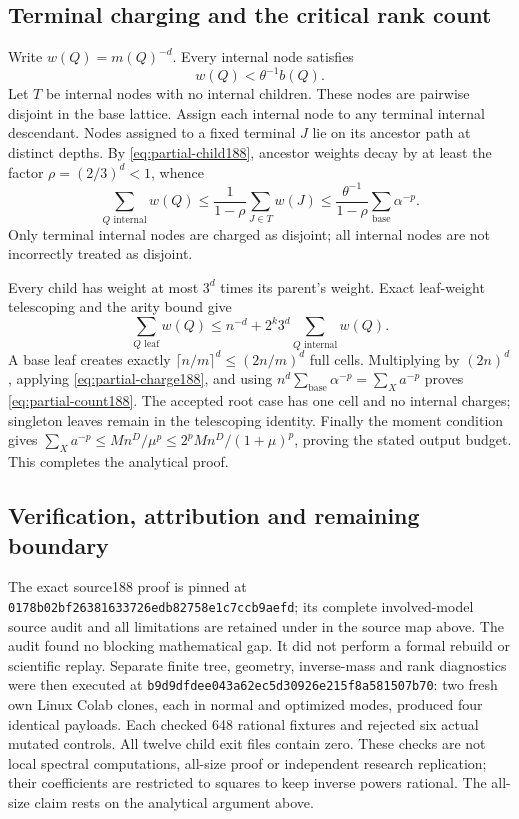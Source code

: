 \subsection{Terminal charging and the critical rank count}
Write $w(Q)=m(Q)^{-d}$. Every internal node satisfies
\[
 w(Q)<\theta^{-1}b(Q).
\]
Let $T$ be internal nodes with no internal children. These nodes are
pairwise disjoint in the base lattice. Assign each internal node to any
terminal internal descendant. Nodes assigned to a fixed terminal $J$ lie
on its ancestor path at distinct depths. By \eqref{eq:partial-child188},
ancestor weights decay by at least the factor $\rho=(2/3)^d<1$, whence
\begin{equation}\label{eq:partial-charge188}
 \sum_{Q\text{ internal}}w(Q)
 \le\frac{1}{1-\rho}\sum_{J\in T}w(J)
 \le\frac{\theta^{-1}}{1-\rho}\sum_{\text{base}}\alpha^{-p}.
\end{equation}
Only terminal internal nodes are charged as disjoint; all internal nodes
are not incorrectly treated as disjoint.

Every child has weight at most $3^d$ times its parent's weight. Exact
leaf-weight telescoping and the arity bound give
\[
 \sum_{Q\text{ leaf}}w(Q)
 \le n^{-d}+2^k3^d\sum_{Q\text{ internal}}w(Q).
\]
A base leaf creates exactly $\lceil n/m\rceil^d\le(2n/m)^d$ full cells.
Multiplying by $(2n)^d$, applying \eqref{eq:partial-charge188}, and using
$n^d\sum_{\text{base}}\alpha^{-p}=\sum_Xa^{-p}$ proves
\eqref{eq:partial-count188}. The accepted root case has one cell and no
internal charges; singleton leaves remain in the telescoping identity.
Finally the moment condition gives
$\sum_Xa^{-p}\le Mn^D/\mu^p\le2^pMn^D/(1+\mu)^p$, proving the stated
output budget. This completes the analytical proof.

\subsection{Verification, attribution and remaining boundary}
The exact source188 proof is pinned at
\texttt{0178b02bf26381633726edb82758e1c7ccb9aefd}; its complete involved-model
source audit and all limitations are retained under
 in the source map above.
The audit found no blocking mathematical gap. It did not perform a formal
rebuild or scientific replay. Separate finite tree, geometry, inverse-mass
and rank diagnostics were then executed at
\texttt{b9d9dfdee043a62ec5d30926e215f8a581507b70}: two fresh own Linux Colab
clones, each in normal and optimized modes, produced four identical payloads.
Each checked 648 rational fixtures and rejected six actual mutated controls.
All twelve child exit files contain zero. These checks are not local spectral
computations, all-size proof or independent research replication; their
coefficients are restricted to squares to keep inverse powers rational.
The all-size claim rests on the analytical argument above.

